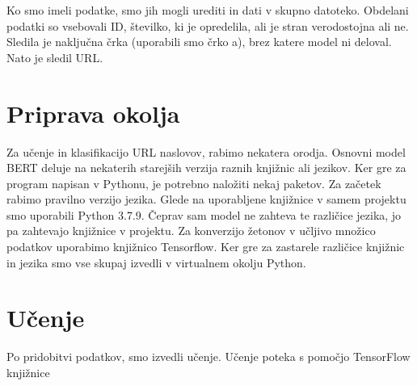 \documentclass[sigconf,nonacm]{acmart}
\begin{document}
Ko smo imeli podatke, smo jih mogli urediti in dati v skupno datoteko. Obdelani podatki so vsebovali ID, številko, ki je opredelila, ali je stran verodostojna ali ne. Sledila je naključna črka (uporabili smo črko a), brez katere model ni deloval. Nato je sledil URL. 

\section{Priprava okolja}
Za učenje in klasifikacijo URL naslovov, rabimo nekatera orodja. Osnovni model BERT deluje na nekaterih starejših verzija raznih knjižnic ali jezikov. Ker gre za program napisan v Pythonu, je potrebno naložiti nekaj paketov. Za začetek rabimo pravilno verzijo jezika. Glede na uporabljene knjižnice v samem projektu smo uporabili Python 3.7.9. Čeprav sam model ne zahteva te različice jezika, jo pa zahtevajo knjižnice v projektu. Za konverzijo žetonov v učljivo množico podatkov uporabimo knjižnico Tensorflow. Ker gre za zastarele različice knjižnic in jezika smo vse skupaj izvedli v virtualnem okolju Python.

\section{Učenje}
Po pridobitvi podatkov, smo izvedli učenje. Učenje poteka s pomočjo TensorFlow knjižnice



\end{document}

